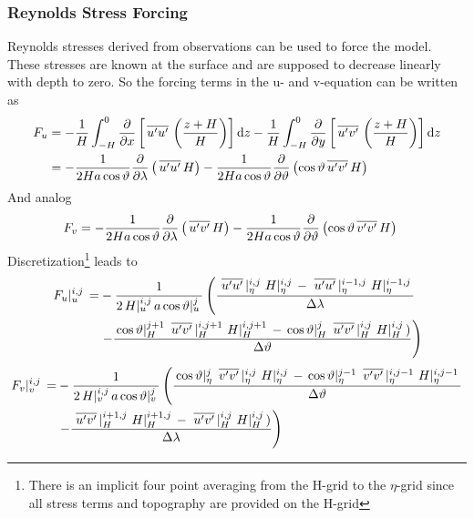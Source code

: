 \documentclass[a4paper]{article}
\begin{document}
\subsubsection{Reynolds Stress Forcing}
Reynolds stresses derived from observations can be used to force the
model. These stresses are known at the surface and are supposed to decrease
linearly with depth to zero. So the forcing terms in the u- and v-equation can
be written as
\begin{equation}
  \begin{split}
    F_u&=-\frac1H\int_{-H}^0\frac{\partial {}}{\partial {x}}\left[\,\overline{{u}'{u}'}\,\left(\frac{z+H}H\right)\right]{\rm d}
    z -
    \frac1H\int_{-H}^0\frac{\partial {}}{\partial {y}}\left[\,\overline{{u}'{v}'}\,\left(\frac{z+H}H\right)\right]{\rm d}
    z\\
    &=-\frac1{2Ha\cos\vartheta}\frac{\partial {}}{\partial {\lambda}}\left(\,\overline{{u}'{u}'}\,H\right)-\frac1{2Ha\cos\vartheta}\frac{\partial {}}{\partial {\vartheta}}\left(\cos\vartheta\,\overline{{u}'{v}'}\,H\right)
  \end{split}
\end{equation}
And analog
\begin{equation}
  \begin{split}
    F_v&=-\frac1{2Ha\cos\vartheta}\frac{\partial {}}{\partial {\lambda}}\left(\,\overline{{u}'{v}'}\,H\right)-\frac1{2Ha\cos\vartheta}\frac{\partial {}}{\partial {\vartheta}}\left(\cos\vartheta\,\overline{{v}'{v}'}\,H\right)
  \end{split}
\end{equation}
Discretization\footnote{There is an implicit four point
  averaging from the H-grid to the $\eta$-grid since all stress terms and topography are
  provided on the H-grid} leads to
\begin{equation}
  \begin{split}
    \,{F_u}\vert_{u}^{{i},{j}}\,=&-\frac1{2\,{H}\vert_{u}^{{i},{j}}\,a\,{\cos\vartheta}\vert_{u}^{{j}}\,}\left(\frac{\,{\,\overline{{u}'{u}'}\,}\vert_{\eta}^{{i},{j}}\,\,{H}\vert_{\eta}^{{i},{j}}\,-\,{\,\overline{{u}'{u}'}\,}\vert_{\eta}^{{i-1},{j}}\,\,{H}\vert_{\eta}^{{i-1},{j}}\,}{\Delta\lambda}\right.\\
&\left.-\frac{\,{\cos\vartheta}\vert_{H}^{{j+1}}\,\,{\,\overline{{u}'{v}'}\,}\vert_{H}^{{i},{j+1}}\,\,{H}\vert_{H}^{{i},{j+1}}\,-\,{\cos\vartheta}\vert_{H}^{{j}}\,\,{\,\overline{{u}'{v}'}\,}\vert_{H}^{{i},{j}}\,\,{H}\vert_{H}^{{i},{j}}\,)}{\Delta\vartheta}\right)
  \end{split}
\end{equation}
\begin{equation}
  \begin{split}
    \,{F_v}\vert_{v}^{{i},{j}}\,=&-\frac1{2\,{H}\vert_{v}^{{i},{j}}\,a\,{\cos\vartheta}\vert_{v}^{{j}}\,}\left(\frac{\,{\cos\vartheta}\vert_{\eta}^{{j}}\,\,{\,\overline{{v}'{v}'}\,}\vert_{\eta}^{{i},{j}}\,\,{H}\vert_{\eta}^{{i},{j}}\,-\,{\cos\vartheta}\vert_{\eta}^{{j-1}}\,\,{\,\overline{{v}'{v}'}\,}\vert_{\eta}^{{i},{j-1}}\,\,{H}\vert_{\eta}^{{i},{j-1}}\,}{\Delta\vartheta}\right.\\
&\left.-\frac{\,{\,\overline{{u}'{v}'}\,}\vert_{H}^{{i+1},{j}}\,\,{H}\vert_{H}^{{i+1},{j}}\,-\,{\,\overline{{u}'{v}'}\,}\vert_{H}^{{i},{j}}\,\,{H}\vert_{H}^{{i},{j}}\,)}{\Delta\lambda}\right)
  \end{split}
\end{equation}
\end{document}
